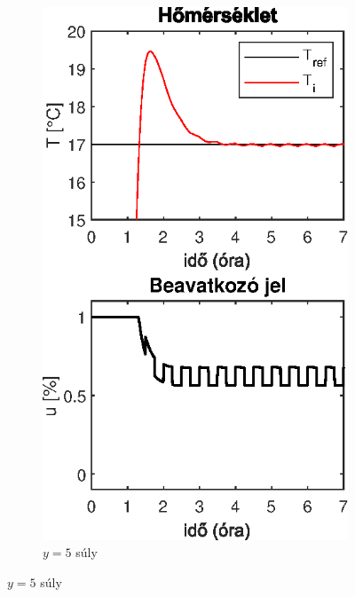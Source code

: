 \begin{figure}[H]
\begin{subfigure}[t]{0.32\textwidth}
		\includegraphics[width=\textwidth]{figures/realsys/mpc-wy-5}
		\caption{$y=5$ súly}
		\label{fig:mpc-wy-5}
	\end{subfigure}	
\end{figure}